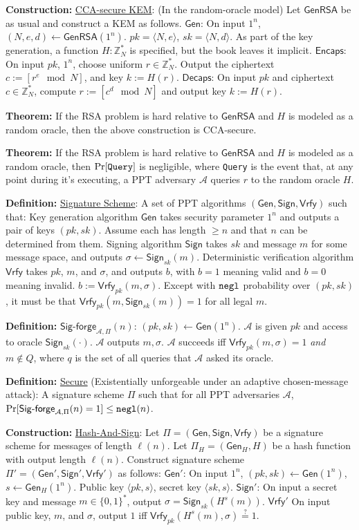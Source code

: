 \documentclass[10pt]{article}
\newcommand{\Z}{\mathbb{Z}}
\newcommand{\AAA}{\mathcal{A}}
\newcommand{\defn}[1]{{\bf Definition:} \underline{#1}}
\newcommand{\thm}[1]{{\bf Theorem:} \underline{#1}}
\newcommand{\con}[1]{{\bf Construction:} \underline{#1}}
\newcommand{\Encaps}{\mathsf{Encaps}}
\newcommand{\Decaps}{\mathsf{Decaps}}
\newcommand{\Sign}{\mathsf{Sign}}
\newcommand{\Vrfy}{\mathsf{Vrfy}}
\newcommand{\Gen}{\mathsf{Gen}}
\newcommand{\GenRSA}{\mathsf{GenRSA}}
\newcommand{\ang}[1]{\langle#1\rangle}
\newcommand{\ExptSigF}{\mathsf{Sig\text{-}forge}_{\AAA,\Pi}}
\newcommand{\negl}{{\tt negl}}
\newcommand{\from}{\leftarrow}
\begin{document}
\begin{multicols}{3}
\con{CCA-secure KEM}: (In the random-oracle model) Let $\GenRSA$ be as usual and construct a KEM as follows. $\Gen$: On input $1^n$, $(N,e,d)\from\GenRSA(1^n)$. $pk=\ang{N,e}$, $sk=\ang{N,d}$. As part of the key generation, a function $H:\Z_N^*$ is specified, but the book leaves it implicit. $\Encaps$: On input $pk$, $1^n$, choose uniform $r\in\Z_N^*$. Output the ciphertext $c:=[r^e\mod{N}]$, and key $k:=H(r)$. $\Decaps$: On input $pk$ and ciphertext $c\in\Z_N^*$, compute $r:=[c^d\mod{N}]$ and output key $k:=H(r)$.

\thm{} If the RSA problem is hard relative to $\GenRSA$ and $H$ is modeled as a random oracle, then the above construction is CCA-secure.

\thm{}If the RSA problem is hard relative to $\GenRSA$ and $H$ is modeled as a random oracle, then $\Pr[{\tt Query}]$ is negligible, where {\tt Query} is the event that, at any point during it's executing, a PPT adversary $\AAA$ queries $r$ to the random oracle $H$.

\defn{Signature Scheme}: A set of PPT algorithms $(\Gen,\Sign,\Vrfy)$ such that: Key generation algorithm $\Gen$ takes security parameter $1^n$ and outputs a pair of keys $(pk,sk)$. Assume each has length $\geq n$ and that $n$ can be determined from them. Signing algorithm $\Sign$ takes $sk$ and message $m$ for some message space, and outputs $\sigma\from\Sign_{sk}(m)$. Deterministic verification algorithm $\Vrfy$ takes $pk$, $m$, and $\sigma$, and outputs $b$, with $b=1$ meaning valid and $b=0$ meaning invalid. $b:=\Vrfy_{pk}(m,\sigma)$. Except with $\negl$ probability over $(pk,sk)$, it must be that $\Vrfy_{pk}(m,\Sign_{sk}(m))=1$ for all legal $m$.

\defn{$\ExptSigF(n)$}: $(pk,sk)\from\Gen(1^n)$. $\AAA$ is given $pk$ and access to oracle $\Sign_{sk}(\cdot)$. $\AAA$ outputs $m,\sigma$. $\AAA$ succeeds iff $\Vrfy_{pk}(m,\sigma)=1$ {\it and} $m\not\in Q$, where $q$ is the set of all queries that $\AAA$ asked its oracle.

\defn{Secure} (Existentially unforgeable under an adaptive chosen-message attack): A signature scheme $\Pi$ such that for all PPT adversaries $\AAA$, $\Pr[\ExptSigF(n)=1]\leq\negl(n)$.

\con{Hash-And-Sign}: Let $\Pi=(\Gen,\Sign,\Vrfy)$ be a signature scheme for messages of length $\ell(n)$. Let $\Pi_{H}=(\Gen_H,H)$ be a hash function with output length $\ell(n)$. Construct signature scheme $\Pi'=(\Gen',\Sign',\Vrfy')$ as follows: $\Gen'$: On input $1^n$, $(pk,sk)\from\Gen(1^n)$, $s\from\Gen_H(1^n)$. Public key $\ang{pk,s}$, secret key $\ang{sk,s}$. $\Sign'$: On input a secret key and message $m\in\{0,1\}^*$, output $\sigma=\Sign_{sk}(H^s(m))$. $\Vrfy'$ On input public key, $m$, and $\sigma$, output $1$ iff $\Vrfy_{pk}(H^s(m),\sigma)\overset{?}{=}1$.


\end{multicols}
\end{document}
